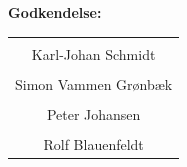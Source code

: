 \begin{minipage}[t]{0.483\textwidth}
	\textbf{Godkendelse:}\vspace{1cm}
\begin{table}[H]
	\centering
	\begin{tabular}{c}
		\underline{\phantom{mmmmmmmmmmmmmm}}  \\
		Karl-Johan Schmidt \vspace{2cm}\\
		\underline{\phantom{mmmmmmmmmmmmmm}} \\
		Simon Vammen Grønbæk \vspace{2cm}	\\
		\underline{\phantom{mmmmmmmmmmmmmm}} \\
		Peter Johansen \vspace{2cm}	\\
		\underline{\phantom{mmmmmmmmmmmmmm}} \\
		Rolf Blauenfeldt \vspace{2cm}	\\
	\end{tabular}
\end{table}
\end{minipage}

\vfill

